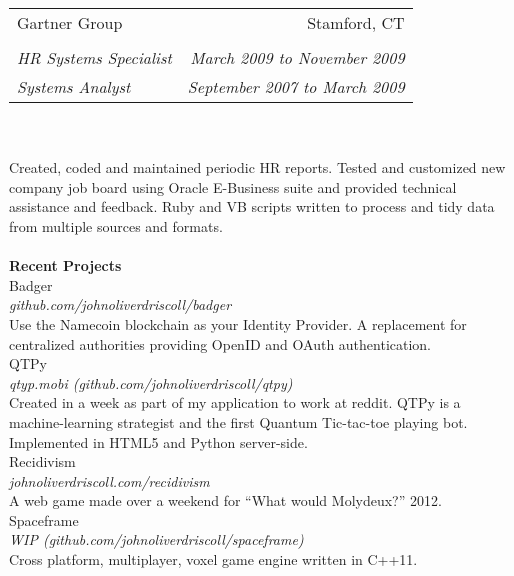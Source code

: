 \documentclass[11pt]{article}
\begin{document}
\noindent
\begin{tabular*}{\textwidth}{@{\extracolsep{\fill}}lr}
\large{Gartner Group} & Stamford, CT\\\\[-0.1in]
\textsl{HR Systems Specialist} &
\textsl{\small{March 2009 to November 2009}}\\
\textsl{Systems Analyst} &
\textsl{\small{September 2007 to March 2009}}\\
\end{tabular*}\\\\
{\small\noindent
Created, coded and maintained periodic HR reports.  Tested and customized new 
company job board using Oracle E-Business suite and provided technical
assistance and feedback.  Ruby and VB scripts written to process and tidy data
from multiple sources and formats.
}\\\\

\noindent
\large\textbf{Recent Projects}\\

\noindent
\large{Badger}\\
\textsl{github.com/johnoliverdriscoll/badger}\\
{\small\noindent
Use the Namecoin blockchain as your Identity Provider.  A replacement
for centralized authorities providing OpenID and OAuth authentication.
}\\

\noindent
\large{QTPy}\\
\textsl{qtyp.mobi \footnotesize{(github.com/johnoliverdriscoll/qtpy)}}\\
{\small\noindent
Created in a week as part of my application to work at reddit.  QTPy is a 
machine-learning strategist and the first Quantum Tic-tac-toe playing bot. 
Implemented in HTML5 and Python server-side.
}\\

\noindent
\large{Recidivism}\\
\textsl{johnoliverdriscoll.com/recidivism}\\
{\small\noindent
A web game made over a weekend for ``What would Molydeux?'' 2012.
}\\

\noindent
\large{Spaceframe}\\
\textsl{WIP \footnotesize{(github.com/johnoliverdriscoll/spaceframe)}}\\
{\small\noindent
Cross platform, multiplayer, voxel game engine written in C++11.
}\\
\end{document}
